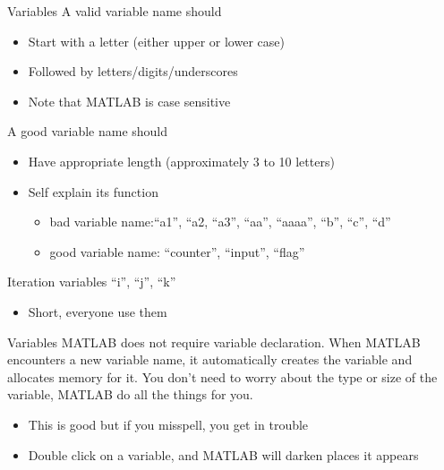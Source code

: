 \begin{frame}{Variables}
A valid variable name should
\begin{itemize}
\item Start with a letter (either upper or lower case)
\item Followed by letters/digits/underscores
\item Note that MATLAB is case sensitive
\end{itemize}
A good variable name should\footnotemark
\begin{itemize}
\item Have appropriate length (approximately 3 to 10 letters)
\item Self explain its function
\begin{itemize}
\item bad variable name:``a1'', ``a2, ``a3'', ``aa'', ``aaaa'', ``b'', ``c'', ``d''
\item good variable name: ``counter'', ``input'', ``flag''
\end{itemize}
\end{itemize}
Iteration variables ``i'', ``j'', ``k''
\begin{itemize}
\item Short, everyone use them
\end{itemize}
\end{frame}

\begin{frame}{Variables}
MATLAB does not require variable declaration. When MATLAB encounters a new variable name, it automatically creates the variable and allocates memory for it. You don't need to worry about the type or size of the variable, MATLAB do all the things for you. 
\begin{itemize}
\item This is good but if you misspell, you get in trouble 
\item Double click on a variable, and MATLAB will darken places it appears
\end{itemize}
\end{frame}

